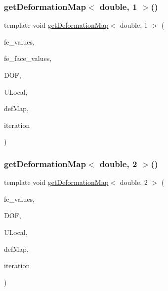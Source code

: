 \mbox{\label{function_evaluations_8cc_a2128b8b5715cb868caf25dc37b818a1d}} 
\subsubsection{\texorpdfstring{get\+Deformation\+Map$<$ double, 1 $>$()}{getDeformationMap< double, 1 >()}\hspace{0.1cm}{\footnotesize\ttfamily [2/2]}}
{\footnotesize\ttfamily template void \mbox{\hyperlink{group___evaluation_functions_ga239b206235603af9482484c29c8d57ea}{get\+Deformation\+Map}}$<$ double, 1 $>$ (\begin{DoxyParamCaption}\item[{const F\+E\+Values$<$ 1 $>$ \&}]{fe\+\_\+values,  }\item[{const F\+E\+Face\+Values$<$ 1 $>$ \&}]{fe\+\_\+face\+\_\+values,  }\item[{unsigned int}]{D\+OF,  }\item[{Table$<$ 1, double $>$ \&}]{U\+Local,  }\item[{\mbox{\hyperlink{structdeformation_map}{deformation\+Map}}$<$ double, 1 $>$ \&}]{def\+Map,  }\item[{unsigned int}]{iteration }\end{DoxyParamCaption})}

\mbox{\label{function_evaluations_8cc_a934f34bca13586e71d79d67e2d405170}} 
\subsubsection{\texorpdfstring{get\+Deformation\+Map$<$ double, 2 $>$()}{getDeformationMap< double, 2 >()}\hspace{0.1cm}{\footnotesize\ttfamily [1/2]}}
{\footnotesize\ttfamily template void \mbox{\hyperlink{group___evaluation_functions_ga239b206235603af9482484c29c8d57ea}{get\+Deformation\+Map}}$<$ double, 2 $>$ (\begin{DoxyParamCaption}\item[{const F\+E\+Values$<$ 2 $>$ \&}]{fe\+\_\+values,  }\item[{unsigned int}]{D\+OF,  }\item[{Table$<$ 1, double $>$ \&}]{U\+Local,  }\item[{\mbox{\hyperlink{structdeformation_map}{deformation\+Map}}$<$ double, 2 $>$ \&}]{def\+Map,  }\item[{unsigned int}]{iteration }\end{DoxyParamCaption})}

